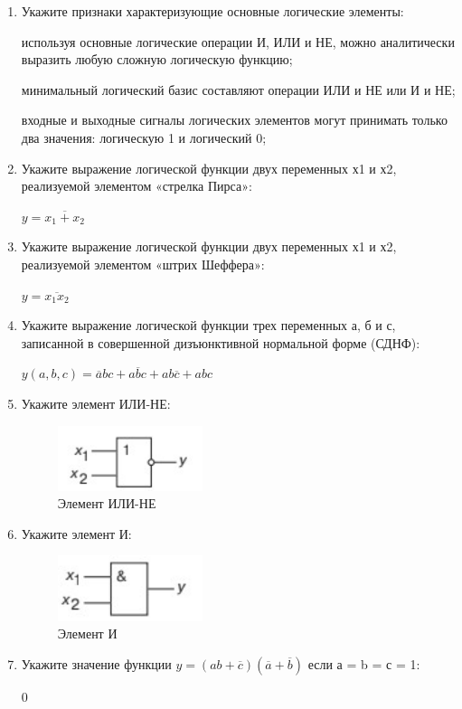 \documentclass[spec, och, labwork]{shiza}
\begin{document}
\begin{enumerate}
    \item Укажите признаки характеризующие основные логические элементы:
    
    используя основные логические операции И, ИЛИ и НЕ, можно аналитически
    выразить любую сложную логическую функцию;

    минимальный логический базис составляют операции ИЛИ и НЕ или И и НЕ;

    входные и выходные сигналы логических элементов могут принимать только
    два значения: логическую 1 и логический 0;
    \item Укажите выражение логической функции двух переменных х1 и х2, реализуемой элементом «стрелка Пирса»:
    
    $y = \overline{x_1 + x_2}$

    \item Укажите выражение логической функции двух переменных х1 и х2, реализуемой элементом «штрих Шеффера»:
    
    $y = \overline{x_1x_2}$

    \item Укажите выражение логической функции трех переменных а, б и с, записанной
    в совершенной дизъюнктивной нормальной форме (СДНФ):

    $y(a, b, c) = \overline{a}bc + a\overline{b}c + ab\overline{c} + abc$

    \item Укажите элемент ИЛИ-НЕ:
    
    \begin{figure}[H]
        \centering      %
        \includegraphics[width=0.4\textwidth]{4}
        \caption{Элемент ИЛИ-НЕ}
        \label{fig:image1}
    \end{figure}

    \item Укажите элемент И:
    
    \begin{figure}[H]
        \centering      %
        \includegraphics[width=0.4\textwidth]{5}
        \caption{Элемент И}
        \label{fig:image1}
    \end{figure}

    \item Укажите значение функции $y = (ab + \overline{c})(\overline{a} + \overline{b})$ если а = b = с = 1:
    
    0
\end{enumerate}
\end{document}
